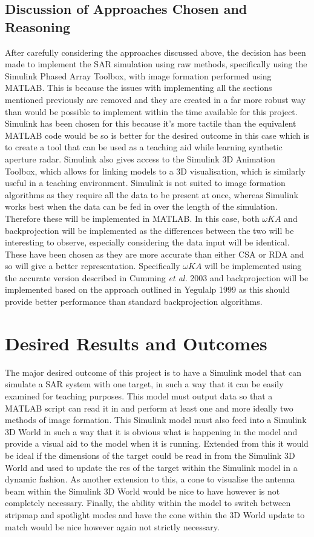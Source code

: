 \subsection{Discussion of Approaches Chosen and Reasoning}
\label{subsec:approach_chosen}
After carefully considering the approaches discussed above, the decision has been made to implement the SAR simulation using raw methods, specifically using the Simulink Phased Array Toolbox, with image formation performed using MATLAB. This is because the issues with implementing all the sections mentioned previously are removed and they are created in a far more robust way than would be possible to implement within the time available for this project. Simulink has been chosen for this because it's more tactile than the equivalent MATLAB code would be so is better for the desired outcome in this case which is to create a tool that can be used as a teaching aid while learning synthetic aperture radar. Simulink also gives access to the Simulink 3D Animation Toolbox, which allows for linking models to a 3D visualisation, which is similarly useful in a teaching environment. Simulink is not suited to image formation algorithms as they require all the data to be present at once, whereas Simulink works best when the data can be fed in over the length of the simulation. Therefore these will be implemented in MATLAB. In this case, both $\omega KA$ and backprojection will be implemented as the differences between the two will be interesting to observe, especially considering the data input will be identical. These have been chosen as they are more accurate than either CSA or RDA and so will give a better representation. Specifically $\omega KA$ will be implemented using the accurate version described in Cumming \textit{et al.} 2003 \cite{cummingInterpretationsOmegaKAlgorithm2003} and backprojection will be implemented based on the approach outlined in Yegulalp 1999 \cite{yegulalpFastBackprojectionAlgorithm1999} as this should provide better performance than standard backprojection algorithms.
\section{Desired Results and Outcomes}
The major desired outcome of this project is to have a Simulink model that can simulate a SAR system with one target, in such a way that it can be easily examined for teaching purposes. This model must output data so that a MATLAB script can read it in and perform at least one and more ideally two methods of image formation. This Simulink model must also feed into a Simulink 3D World in such a way that it is obvious what is happening in the model and provide a visual aid to the model when it is running. Extended from this it would be ideal if the dimensions of the target could be read in from the Simulink 3D World and used to update the \gls{rcs} of the target within the Simulink model in a dynamic fashion. As another extension to this, a cone to visualise the antenna beam within the Simulink 3D World would be nice to have however is not completely necessary. Finally, the ability within the model to switch between stripmap and spotlight modes and have the cone within the 3D World update to match would be nice however again not strictly necessary. 
